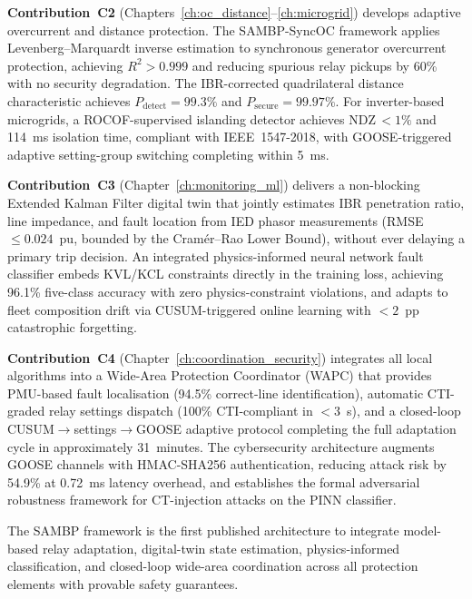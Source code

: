 \begin{doublespacing}
\textbf{Contribution~C2} (Chapters~\ref{ch:oc_distance}--\ref{ch:microgrid})
develops adaptive overcurrent and distance protection. The SAMBP-SyncOC
framework applies Levenberg--Marquardt inverse estimation to synchronous
generator overcurrent protection, achieving $R^2 > 0.999$ and reducing
spurious relay pickups by 60\% with no security degradation. The
IBR-corrected quadrilateral distance characteristic achieves
$P_\mathrm{detect} = 99.3\%$ and $P_\mathrm{secure} = 99.97\%$. For
inverter-based microgrids, a ROCOF-supervised islanding detector achieves
NDZ\,$< 1\%$ and 114~ms isolation time, compliant with IEEE~1547-2018, with
GOOSE-triggered adaptive setting-group switching completing within 5~ms.

\textbf{Contribution~C3} (Chapter~\ref{ch:monitoring_ml}) delivers a
non-blocking Extended Kalman Filter digital twin that jointly estimates IBR
penetration ratio, line impedance, and fault location from IED phasor
measurements (RMSE\,$\leq 0.024$~pu, bounded by the Cramér--Rao Lower Bound),
without ever delaying a primary trip decision. An integrated physics-informed
neural network fault classifier embeds KVL/KCL constraints directly in the
training loss, achieving 96.1\% five-class accuracy with zero
physics-constraint violations, and adapts to fleet composition drift via
CUSUM-triggered online learning with $< 2$~pp catastrophic forgetting.

\textbf{Contribution~C4} (Chapter~\ref{ch:coordination_security}) integrates
all local algorithms into a Wide-Area Protection Coordinator (WAPC) that
provides PMU-based fault localisation (94.5\% correct-line identification),
automatic CTI-graded relay settings dispatch (100\% CTI-compliant in $< 3$~s),
and a closed-loop CUSUM$\to$settings$\to$GOOSE adaptive protocol completing
the full adaptation cycle in approximately 31~minutes. The cybersecurity
architecture augments GOOSE channels with HMAC-SHA256 authentication,
reducing attack risk by 54.9\% at 0.72~ms latency overhead, and establishes
the formal adversarial robustness framework for CT-injection attacks on the
PINN classifier.

The SAMBP framework is the first published architecture to integrate
model-based relay adaptation, digital-twin state estimation, physics-informed
classification, and closed-loop wide-area coordination across all protection
elements with provable safety guarantees.

\end{doublespacing}
